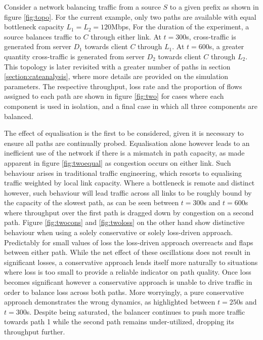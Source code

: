 Consider a network balancing traffic from a source $S$ to a given prefix as shown in figure \ref{fig:topo}.
For the current example, only two paths are available with equal bottleneck capacity $L_1=L_2=120$Mbps,
For the duration of the experiment, a source balances traffic to $C$ through either link.
At $t=300$s, cross-traffic is generated from server $D_1$ towards client $C$ through $L_1$.
At $t=600$s, a greater quantity cross-traffic is generated from server $D_2$ towards client $C$ through $L_2$.
This topology is later revisited with a greater number of paths in section \ref{section:cateanalysis}, where more details are provided on the simulation parameters.
The respective throughput, loss rate and the proportion of flows assigned to each path are shown in figure \ref{fig:two} for cases where each component is used in isolation, and a final case in which all three components are balanced.

The effect of equalisation is the first to be considered, given it is necessary to ensure all paths are continually probed. 
Equalisation alone however leads to an inefficient use of the network if there is a mismatch in path capacity, as made apparent in figure \ref{fig:twoequal} as congestion occurs on either link. 
Such behaviour arises in traditional traffic engineering, which resorts to equalising traffic weighted by local link capacity.  
Where a bottleneck is remote and distinct however, such behaviour will lead traffic across all links to be roughly bound by the capacity of the slowest path, as can be seen between $t=300$s and $t=600$s where throughput over the first path is dragged down by congestion on a second path.  
Figure \ref{fig:twocons} and \ref{fig:twoloss} on the other hand show distinctive behaviour when using a solely conservative or solely loss-driven approach. 
Predictably for small values of loss the loss-driven approach overreacts and flaps between either path. 
While the net effect of these oscillations does not result in significant losses, a conservative approach lends itself more naturally to situations where loss is too small to provide a reliable indicator on path quality. 
Once loss becomes significant however a conservative approach is unable to drive traffic in order to balance loss across both paths. 
More worryingly, a pure conservative approach demonstrates the wrong dynamics, as highlighted between $t=250$s and $t=300$s. 
Despite being saturated, the balancer continues to push more traffic towards path 1 while the second path remains under-utilized, dropping its throughput further.

